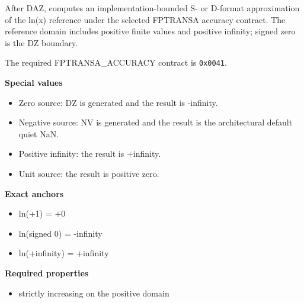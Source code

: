 After DAZ, computes an implementation-bounded S- or D-format approximation of the ln(x) reference under the selected FPTRANSA accuracy contract. The reference domain includes positive finite values and positive infinity; signed zero is the DZ boundary.

The required FPTRANSA\_ACCURACY contract is \texttt{0x0041}.

\textbf{Special values}\par
\begin{itemize}
\item Zero source: DZ is generated and the result is -infinity.
\item Negative source: NV is generated and the result is the architectural default quiet NaN.
\item Positive infinity: the result is +infinity.
\item Unit source: the result is positive zero.
\end{itemize}

\textbf{Exact anchors}\par
\begin{itemize}
\item ln(+1) = +0
\item ln(signed 0) = -infinity
\item ln(+infinity) = +infinity
\end{itemize}

\textbf{Required properties}\par
\begin{itemize}
\item strictly increasing on the positive domain
\end{itemize}
